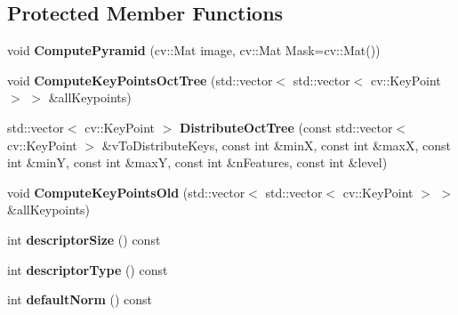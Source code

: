 \subsection*{Protected Member Functions}
\begin{DoxyCompactItemize}
\item 
void {\bfseries Compute\+Pyramid} (cv\+::\+Mat image, cv\+::\+Mat Mask=cv\+::\+Mat())\hypertarget{classMultiColSLAM_1_1mdBRIEFextractorOct_a34e617b89aad33b8baf5ff160fa1480d}{}\label{classMultiColSLAM_1_1mdBRIEFextractorOct_a34e617b89aad33b8baf5ff160fa1480d}

\item 
void {\bfseries Compute\+Key\+Points\+Oct\+Tree} (std\+::vector$<$ std\+::vector$<$ cv\+::\+Key\+Point $>$ $>$ \&all\+Keypoints)\hypertarget{classMultiColSLAM_1_1mdBRIEFextractorOct_abc83299607474e76f195f47fafc97e64}{}\label{classMultiColSLAM_1_1mdBRIEFextractorOct_abc83299607474e76f195f47fafc97e64}

\item 
std\+::vector$<$ cv\+::\+Key\+Point $>$ {\bfseries Distribute\+Oct\+Tree} (const std\+::vector$<$ cv\+::\+Key\+Point $>$ \&v\+To\+Distribute\+Keys, const int \&minX, const int \&maxX, const int \&minY, const int \&maxY, const int \&n\+Features, const int \&level)\hypertarget{classMultiColSLAM_1_1mdBRIEFextractorOct_ad4bb778d8f3d9ff53cd1773fe1bcf915}{}\label{classMultiColSLAM_1_1mdBRIEFextractorOct_ad4bb778d8f3d9ff53cd1773fe1bcf915}

\item 
void {\bfseries Compute\+Key\+Points\+Old} (std\+::vector$<$ std\+::vector$<$ cv\+::\+Key\+Point $>$ $>$ \&all\+Keypoints)\hypertarget{classMultiColSLAM_1_1mdBRIEFextractorOct_ae56e6b739363fd3a80470eac6b229e59}{}\label{classMultiColSLAM_1_1mdBRIEFextractorOct_ae56e6b739363fd3a80470eac6b229e59}

\item 
int {\bfseries descriptor\+Size} () const \hypertarget{classMultiColSLAM_1_1mdBRIEFextractorOct_ae9dc926bc5cd772ed717b8892be1545d}{}\label{classMultiColSLAM_1_1mdBRIEFextractorOct_ae9dc926bc5cd772ed717b8892be1545d}

\item 
int {\bfseries descriptor\+Type} () const \hypertarget{classMultiColSLAM_1_1mdBRIEFextractorOct_ab87af935830b78d836cc1e44dc039d8b}{}\label{classMultiColSLAM_1_1mdBRIEFextractorOct_ab87af935830b78d836cc1e44dc039d8b}

\item 
int {\bfseries default\+Norm} () const \hypertarget{classMultiColSLAM_1_1mdBRIEFextractorOct_a9a1000e9964ef88b31941a9daf3e15f9}{}\label{classMultiColSLAM_1_1mdBRIEFextractorOct_a9a1000e9964ef88b31941a9daf3e15f9}

\end{DoxyCompactItemize}

